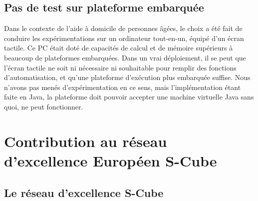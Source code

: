 \subsection{Pas de test sur plateforme embarquée}

Dans le contexte de l'aide à domicile de personnes âgées, le choix a été fait de conduire les expérimentations sur un ordinateur tout-en-un, équipé d'un écran tactile. Ce PC était doté de capacités de calcul et de mémoire supérieurs à beaucoup de plateformes embarquées. Dans un vrai déploiement, il se peut que l'écran tactile ne soit ni nécessaire ni souhaitable pour remplir des fonctions d'automatisation, et qu'une plateforme d'exécution plus embarquée suffise. Nous n'avons pas menés d'expérimentation en ce sens, mais l'implémentation étant faite en Java, la plateforme doit pouvoir accepter une machine virtuelle Java sans quoi, \enti{} ne peut fonctionner.


\section{Contribution au réseau d'excellence Européen S-Cube}

\subsection{Le réseau d'excellence S-Cube}

